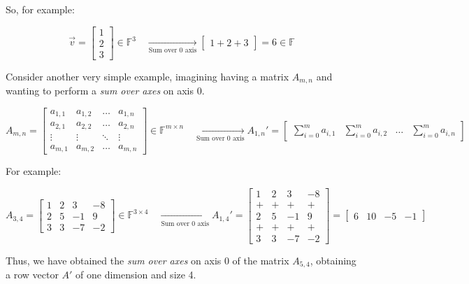 So, for example:

\[
\vec{v} = \begin{bmatrix}
    1 \\
    2 \\
    3
\end{bmatrix} \in \mathbb{F}^3 \quad \underset{\text{Sum over 0 axis}}{\longrightarrow} 
\begin{bmatrix}
    1 + 2 + 3
\end{bmatrix} = 6 \in \mathbb{F}
\]

Consider another very simple example, imagining having a matrix $A_{m,n}$ and wanting to perform a \textit{sum over axes} on axis 0.

$$
A_{m,n} = \begin{bmatrix}
    a_{1,1} & a_{1,2} & \dots & a_{1,n} \\
    a_{2,1} & a_{2,2} & \dots & a_{2,n} \\
    \vdots & \vdots & \ddots & \vdots \\
    a_{m,1} & a_{m,2} & \dots & a_{m,n}
\end{bmatrix}  \in \mathbb{F}^{m \times n} \quad \underset{\text{Sum over 0 axis}}{\longrightarrow} A_{1, n}' = 
\begin{bmatrix}
    \sum_{i=0}^m a_{i,1} & \sum_{i=0}^m a_{i,2} & \dots & \sum_{i=0}^m a_{i,n}
\end{bmatrix}
$$

For example:

\[
A_{3,4} = \begin{bmatrix}
    1 & 2 & 3 & -8 \\
    2 & 5 & -1 & 9 \\
    3 & 3 & -7 & -2
\end{bmatrix} \in \mathbb{F}^{3 \times 4} \quad \underset{\text{Sum over 0 axis}}{\longrightarrow} A_{1, 4}' = 
\begin{bmatrix}
    1 & 2 & 3 & -8 \\
    + & + & + & + \\
    2 & 5 & -1 & 9 \\
    + & + & + & + \\
    3 & 3 & -7 & -2
\end{bmatrix}
=
\begin{bmatrix}
    6 & 10 & -5 & -1
\end{bmatrix}
\]

Thus, we have obtained the \textit{sum over axes} on axis 0 of the matrix $A_{5,4}$, obtaining a row vector $A'$ of one dimension and size 4.

